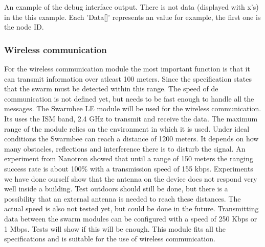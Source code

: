 \documentclass[10pt,a4paper]{article}
\begin{document}
An example of the debug interface output. There is not data (displayed with x's) in the this example. Each 'Data[]' represents an value for example, the first one is the node ID.




\subsubsection{Wireless communication}

For the wireless communication module the most important function is that it can transmit information over atleast 100 meters. Since the specification states that the swarm must be detected within this range. The speed of de communication is not defined yet, but needs to be fast enough to handle all the messages. The Swarmbee LE module will be used for the wireless communication. Its uses the ISM band, 2.4 GHz to transmit and receive the data. The maximum range of the module relies on the environment in which it is used. Under ideal conditions the Swarmbee can reach a distance of 1200 meters. It depends on how many obstacles, reflections and interference there is to disturb the signal. An experiment from Nanotron showed that until a range of 150 meters the ranging success rate is about 100\% with a transmission speed of 155 kbps. Experiments we have done ourself show that the antenna on the device does not respond very well inside a building. Test outdoors should still be done, but there is a possibility that an external antenna is needed to reach these distances. The actual speed is also not tested yet, but could be done in the future. Transmitting data between the swarm modules can be configured with a speed of 250 Kbps or 1 Mbps. Tests will show if this will be enough. This module fits all the specifications and is suitable for the use of wireless communication.
\end{document}
